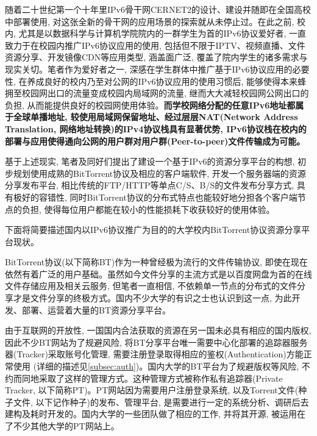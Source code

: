 随着二十世纪第一个十年里IPv6骨干网CERNET2的设计、建设\cite{wujianping2005cngicernet2arch}并随即在全国高校中部署使用\cite{coverreport2005cernet2cngi6ix}, 对这张全新的骨干网的应用场景的探索就从未停止过\cite{huping2008cnnetandcngiapp}。在此之前, 校内, 尤其是以数据科学与计算机学院院内的一群学生为首的IPv6协议爱好者, 一直致力于在校园内推广IPv6协议应用的使用, 包括但不限于IPTV\cite{wangjilong2007iptvincernet2}、视频直播、文件资源分享、开发镜像CDN等应用类型, 涵盖面广泛, 覆盖了院内学生的诸多需求与现实关切。笔者作为爱好者之一, 深感在学生群体中推广基于IPv6协议应用的必要性, 在养成良好的校内乃至对公网的IPv6协议应用的使用习惯后, 能够使得本来蜂拥至校园网出口的流量变成校园内局域网的流量, 继而大大减轻校园网公网出口的负担, 从而能提供良好的校园网使用体验。\textbf{而学校网络分配的任意IPv6地址都属于全球单播地址, 较使用局域网保留地址、经过层层NAT(Network Address Translation, 网络地址转换)的IPv4协议栈具有显著优势, IPv6协议栈在校内的部署与应用使得通向公网的用户群对用户群(Peer-to-peer)文件传输成为可能。}

基于上述现实, 笔者及同好们提出了建设一个基于IPv6的资源分享平台的构想, 初步规划使用成熟的BitTorrent协议及相应的客户端软件, 开发一个服务器端的资源分享发布平台, 相比传统的FTP/HTTP等单点C/S、B/S的文件发布分享方式, 具有极好的容错性, 同时BitTorrent协议的分布式特点也能较好地分担各个客户端节点的负担, 使得每位用户都能在较小的性能损耗下收获较好的使用体验。

下面将简要描述国内以IPv6协议推广为目的的大学校内BitTorrent协议资源分享平台现状。

BitTorrent协议\cite{cohen2003incentives}\cite{bramcohen2008bep0003}(以下简称BT)作为一种曾经极为流行的文件传输协议, 即使在现在依然有着广泛的用户基础。虽然如今文件分享的主流方式是以百度网盘为首的在线文件存储应用及相关云服务, 但笔者一直相信, 不依赖单一节点的分布式的文件分享才是文件分享的终极方式。国内不少大学的有识之士也认识到这一点, 为此开发、部署、运营着大量的BT资源分享平台。

由于互联网的开放性, 一国国内合法获取的资源在另一国未必具有相应的国内版权, 因此不少BT网站为了规避风险, 将BT分享平台唯一需要中心化部署的追踪器服务器(Tracker)采取账号化管理, 需要注册登录取得相应的鉴权(Authentication)方能正常使用 (详细的描述见\ref{subsec:auth})。国内大学的BT平台为了规避版权等风险, 不约而同地采取了这样的管理方式。这种管理方式被称作私有追踪器(Private Tracker, 以下简称PT)。PT网站因为需要用户注册登录系统, 以及Torrent文件(种子文件, 以下记作种子)的发布、管理平台, 是需要进行一定的系统分析、调研后去建构及耗时开发的。国内大学的一些团队做了相应的工作, 并将其开源, 被运用在了不少其他大学的PT网站上。

